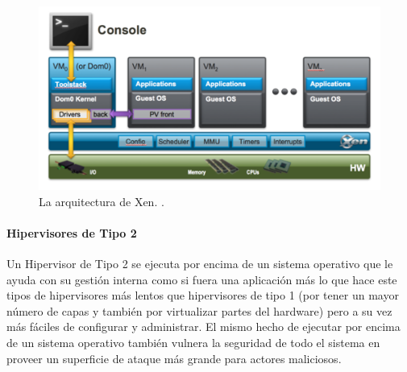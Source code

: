 \begin{figure}
  \begin{center}
      \includegraphics[width=\textwidth]{Figures/arq-xen.png}
  \end{center}
  \caption{La arquitectura de Xen.   \citep{Xen-Project-Overview}.}
  \label{arq-xen}
\end{figure}

 
\paragraph{Hipervisores de Tipo 2}
Un Hipervisor de Tipo 2 se ejecuta por encima de un sistema operativo que le ayuda con su gestión interna como si fuera una aplicación más \citep{IBM-Hypervisors} lo que hace este tipos de hipervisores más lentos que hipervisores de tipo 1 (por tener un mayor número de capas y también por virtualizar partes del hardware) pero a su vez más fáciles de configurar y administrar. El mismo hecho de ejecutar por encima de un sistema operativo también vulnera la seguridad de todo el sistema en proveer un superficie de ataque más grande para actores maliciosos.

